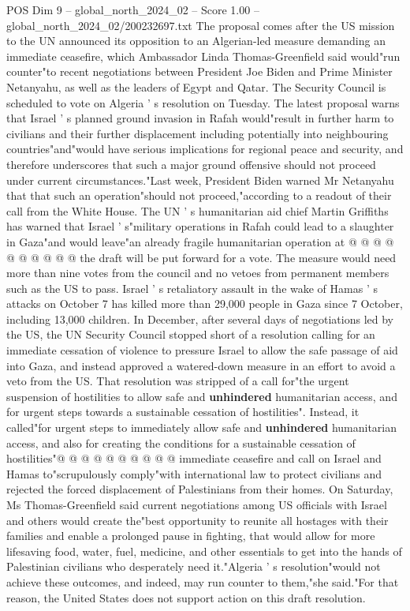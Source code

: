 \begin{textsample}{POS Dim 9 – global\_north\_2024\_02 – Score 1.00 – global\_north\_2024\_02/200232697.txt}  \label{ex:f9_pos_216}
The proposal comes after the US mission to the UN announced its opposition to an Algerian-led measure demanding an immediate ceasefire, which Ambassador Linda Thomas-Greenfield said would"run counter"to recent negotiations between President Joe Biden and Prime Minister Netanyahu, as well as the leaders of Egypt and Qatar.
The Security Council is scheduled to vote on Algeria ' s resolution on Tuesday.
The latest proposal warns that Israel ' s planned ground invasion in Rafah would"result in further harm to civilians and their further displacement including potentially into neighbouring countries"and"would have serious implications for regional peace and security, and therefore underscores that such a major ground offensive should not proceed under current circumstances."Last week, President Biden warned Mr Netanyahu that that such an operation"should not proceed,"according to a readout of their call from the White House.
The UN ' s humanitarian aid chief Martin Griffiths has warned that Israel ' s"military operations in Rafah could lead to a slaughter in Gaza"and would leave"an already fragile humanitarian operation at @ @ @ @ @ @ @ @ @ @ the draft will be put forward for a vote.
The measure would need more than nine votes from the council and no vetoes from permanent members such as the US to pass.
Israel ' s retaliatory assault in the wake of Hamas ' s attacks on October 7 has killed more than 29,000 people in Gaza since 7 October, including 13,000 children.
In December, after several days of negotiations led by the US, the UN Security Council stopped short of a resolution calling for an immediate cessation of violence to pressure Israel to allow the safe passage of aid into Gaza, and instead approved a watered-down measure in an effort to avoid a veto from the US.
That resolution was stripped of a call for"the urgent suspension of hostilities to allow safe and \textbf{unhindered} humanitarian access, and for urgent steps towards a sustainable cessation of hostilities".
Instead, it called"for urgent steps to immediately allow safe and \textbf{unhindered} humanitarian access, and also for creating the conditions for a sustainable cessation of hostilities"@ @ @ @ @ @ @ @ @ @ immediate ceasefire and call on Israel and Hamas to"scrupulously comply"with international law to protect civilians and rejected the forced displacement of Palestinians from their homes.
On Saturday, Ms Thomas-Greenfield said current negotiations among US officials with Israel and others would create the"best opportunity to reunite all hostages with their families and enable a prolonged pause in fighting, that would allow for more lifesaving food, water, fuel, medicine, and other essentials to get into the hands of Palestinian civilians who desperately need it."Algeria ' s resolution"would not achieve these outcomes, and indeed, may run counter to them,"she said."For that reason, the United States does not support action on this draft resolution.

\end{textsample}
